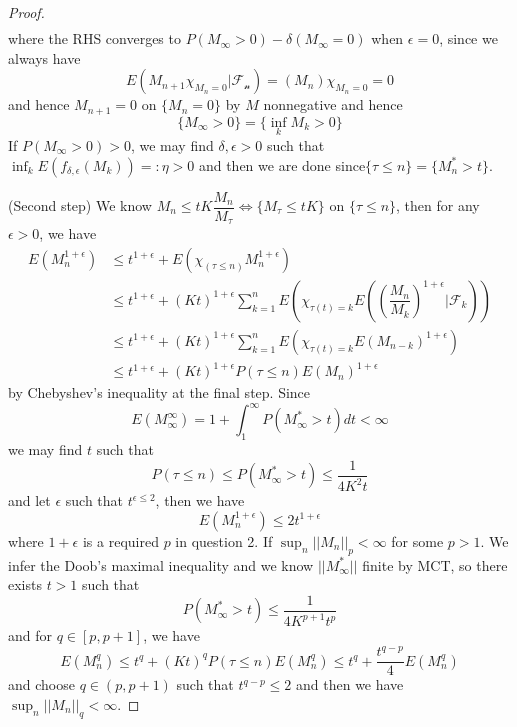 \begin{proof}
\[\begin{aligned}
    \end{aligned}
    \]
    where the RHS converges to $P(M_{\infty} > 0)- \delta(M_{\infty} = 0)$ when $\epsilon = 0$, since we always have
    \[
    E(M_{n+1}\chi_{M_n = 0}|\mathcal{F_n}) = (M_n)\chi_{M_n = 0} = 0
    \]
    and hence $M_{n+1} = 0$ on $\{M_n = 0\}$ by $M$ nonnegative and hence
    \[
    \{M_{\infty} > 0\} = \{\inf_k M_k > 0\}
    \]
    If $P(M_{\infty} > 0) > 0$, we may find $\delta,\epsilon > 0$ such that $\inf_{k} E(f_{\delta,\epsilon}(M_k)) =: \eta >0$
    and then we are done since$
    \{\tau \leq n\} = \{M_n^* > t\}$.\par
    (Second step) We know $M_n \leq tK\dfrac{M_n}{M_{\tau}} \Leftrightarrow \{M_{\tau} \leq tK\}$ on $\{\tau \leq n\}$, then for any $\epsilon > 0$, we have
    \[
    \begin{aligned}
        E(M_n^{1+\epsilon}) &\leq t^{1+\epsilon} + E(\chi_{(\tau\leq n)}M_n^{1+\epsilon}) \\
        &\leq t^{1+\epsilon}+ (Kt)^{1+\epsilon}\sum\limits_{k=1}^nE\left(\chi_{\tau(t) = k}E\left(\left(\dfrac{M_n}{M_k}\right)^{1+\epsilon}|\mathcal{F}_k\right)\right) \\
        &\leq t^{1+\epsilon}+ (Kt)^{1+\epsilon}\sum\limits_{k=1}^nE\left(\chi_{\tau(t) = k}E(M_{n-k})^{1+\epsilon}\right) \\
        &\leq t^{1+\epsilon} + (Kt)^{1+\epsilon}P(\tau\leq n)E(M_n)^{1+\epsilon}
    \end{aligned}
    \]
    by Chebyshev's inequality at the final step. Since
    \[
    E(M_{\infty}^{\infty}) = 1 + \int_1^{\infty}P(M_{\infty}^* > t) dt < \infty
    \]
    we may find $t$ such that
    \[
    P(\tau \leq n) \leq P(M_{\infty}^* > t) \leq \dfrac{1}{4K^2 t}
    \]
    and let $\epsilon$ such that $t^{\epsilon \leq 2}$, then we have
    \[
    E(M_n^{1+\epsilon}) \leq 2t^{1+\epsilon}
    \]
    where $1+\epsilon$ is a required $p$ in question 2. If $\sup_n ||M_n||_p < \infty$ for some $p>1$. We infer the Doob's maximal inequality and we know $||M_{\infty}^*||$ finite by MCT, so there exists $t>1$ such that
    \[
    P(M_{\infty}^* > t) \leq \dfrac{1}{4K^{p+1}t^p}
    \]
    and for $q\in [p,p+1]$, we have
    \[
    E(M_n^q) \leq t^q + (Kt)^qP(\tau\leq n)E(M_n^q) \leq t^q + \dfrac{t^{q-p}}{4}E(M_n^q)
    \]
    and choose $q\in (p,p+1)$ such that $t^{q-p} \leq 2$ and then we have $\sup_n ||M_n||_q < \infty$.
\end{proof}